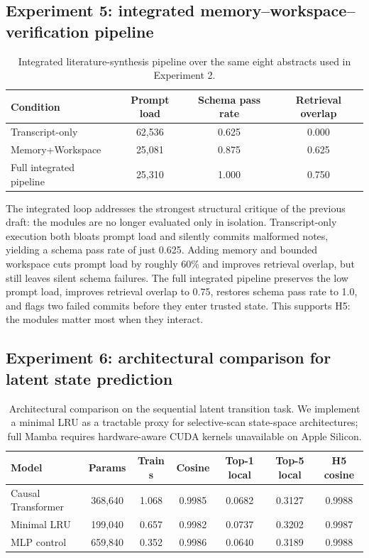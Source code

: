 \documentclass[11pt]{article}
\begin{document}
\subsection{Experiment 5: integrated memory--workspace--verification pipeline}
\begin{table}[t]
    \centering
    \caption{Integrated literature-synthesis pipeline over the same eight abstracts used in Experiment 2.}
    \begin{tabular}{lccc}
        \toprule
        Condition & Prompt load & Schema pass rate & Retrieval overlap \\
        \midrule
        Transcript-only & 62,536 & 0.625 & 0.000 \\
        Memory+Workspace & 25,081 & 0.875 & 0.625 \\
        Full integrated pipeline & 25,310 & 1.000 & 0.750 \\
        \bottomrule
    \end{tabular}
    \label{tab:integrated}
\end{table}

The integrated loop addresses the strongest structural critique of the previous draft: the modules are no longer evaluated only in isolation. Transcript-only execution both bloats prompt load and silently commits malformed notes, yielding a schema pass rate of just 0.625. Adding memory and bounded workspace cuts prompt load by roughly 60\% and improves retrieval overlap, but still leaves silent schema failures. The full integrated pipeline preserves the low prompt load, improves retrieval overlap to 0.75, restores schema pass rate to 1.0, and flags two failed commits before they enter trusted state. This supports H5: the modules matter most when they interact.

\subsection{Experiment 6: architectural comparison for latent state prediction}
\begin{table}[t]
    \centering
    \caption{Architectural comparison on the sequential latent transition task. We implement a minimal LRU as a tractable proxy for selective-scan state-space architectures; full Mamba requires hardware-aware CUDA kernels unavailable on Apple Silicon.}
    \begin{tabular}{lcccccc}
        \toprule
        Model & Params & Train s & Cosine & Top-1 local & Top-5 local & H5 cosine \\
        \midrule
        Causal Transformer & 368,640 & 1.068 & 0.9985 & 0.0682 & 0.3127 & 0.9988 \\
        Minimal LRU & 199,040 & 0.657 & 0.9982 & 0.0737 & 0.3202 & 0.9987 \\
        MLP control & 659,840 & 0.352 & 0.9986 & 0.0640 & 0.3189 & 0.9988 \\
        \bottomrule
    \end{tabular}
    \label{tab:sequence-models}
\end{table}
\end{document}
